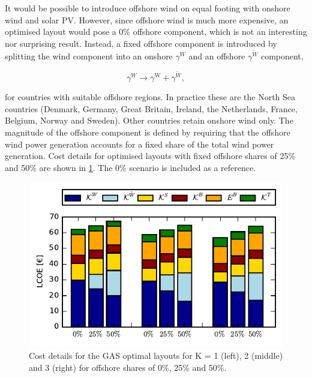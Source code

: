 \documentclass[a4paper, 5p, sort&compress]{elsarticle}%
\begin{document}
It would be possible to introduce offshore wind on equal footing with
onshore wind and solar PV. However, since offshore wind is much more
expensive, an optimised layout would pose a 0\% offshore component,
which is not an interesting nor surprising result. Instead, a fixed
offshore component is introduced by splitting the wind component into
an onshore $\gamma^{W}$ and an offshore $\gamma^{\tilde{W}}$ component,

\begin{equation}
  \label{eq:11}
  \gamma^{W} \to \gamma^{\text{W}} + \gamma^{\text{$\tilde{W}$}},
\end{equation}

for countries with suitable offshore regions. In practice these are
the North Sea countries (Denmark, Germany, Great Britain, Ireland, the
Netherlands, France, Belgium, Norway and Sweden). Other countries
retain onshore wind only. The magnitude of the offshore component is
defined by requiring that the offshore wind power generation accounts
for a fixed share of the total wind power generation. %
%
%
Cost details for optimised layouts with fixed offshore shares of 25\%
and 50\% are shown in \cref{fig:cost-offshore}. The 0\% scenario is
included as a reference.

\begin{figure}[h!]
  \centering
  \includegraphics[width = \columnwidth]{costOffshoreVE50}
  \caption{Cost details for the GAS optimal layouts for K = 1 (left),
    2 (middle) and 3 (right) for offshore shares of 0\%, 25\% and 50\%.}
  \label{fig:cost-offshore}
\end{figure}
\end{document}
